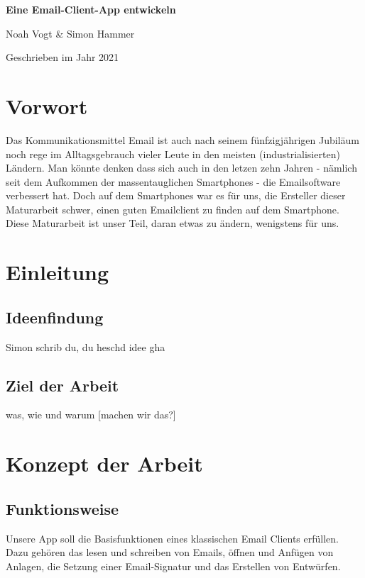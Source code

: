 \documentclass[a4paper,11pt]{article}
\begin{document}
\begin{titlepage}

\vspace*{1cm}
	\centering
	
	{\huge\bfseries Eine Email-Client-App entwickeln \par}
	\vspace{0.5cm}
	{\Large Noah Vogt \& Simon Hammer\par}
	\vspace{17cm}

	{\large Geschrieben im Jahr 2021\par}
	
\end{titlepage}

\tableofcontents
\pagebreak

\section{Vorwort}
Das Kommunikationsmittel Email ist auch nach seinem fünfzigjährigen Jubiläum noch rege im Alltagsgebrauch vieler Leute in den meisten (industrialisierten) Ländern. Man könnte denken dass sich auch in den letzen zehn Jahren - nämlich seit dem Aufkommen der massentauglichen Smartphones - die Emailsoftware verbessert hat. Doch auf dem Smartphones war es für uns, die Ersteller dieser Maturarbeit schwer, einen guten Emailclient zu finden auf dem Smartphone. Diese Maturarbeit ist unser Teil, daran etwas zu ändern, wenigstens für uns.
\section{Einleitung}
\subsection{Ideenfindung}
Simon schrib du, du heschd idee gha
\subsection{Ziel der Arbeit}

 was, wie und warum [machen wir das?]

\section{Konzept der Arbeit}

\subsection{Funktionsweise}
Unsere App soll die Basisfunktionen eines klassischen Email Clients erfüllen. Dazu gehören das lesen und schreiben von Emails, öffnen und Anfügen von Anlagen, die Setzung einer Email-Signatur und das Erstellen von Entwürfen.
\end{document}
